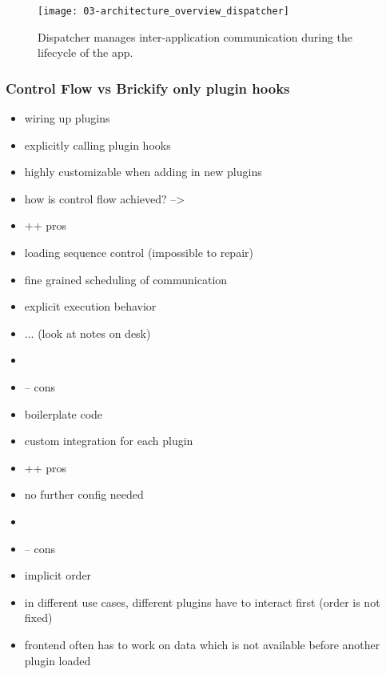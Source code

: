 \documentclass[../ClassicThesis.tex]{subfiles}
\begin{document}
\begin{figure}
  \centering
  \texttt{[image: 03-architecture\_overview\_dispatcher]}
  \caption{Dispatcher manages inter-application communication during the
    lifecycle of the app.}
  \label{fig:architecture_overview_dispatcher}
\end{figure}


\subsubsection{Control Flow vs Brickify only plugin hooks}

\begin{itemize}
\item wiring up plugins
\item explicitly calling plugin hooks
\item highly customizable when adding in new plugins
\item how is control flow achieved? -->
\end{itemize}

\begin{itemize}
\item ++ pros
\item loading sequence control (impossible to repair)
\item fine grained scheduling of communication
\item explicit execution behavior
\item ... (look at notes on desk)
\item
\item -- cons
\item boilerplate code
\item custom integration for each plugin
\end{itemize}

\begin{itemize}
\item ++ pros
\item no further config needed
\item
\item -- cons
\item implicit order
\item in different use cases, different plugins have to interact first (order is
  not fixed)
\item frontend often has to work on data which is not available before another
  plugin loaded
\end{itemize}

\end{document}
